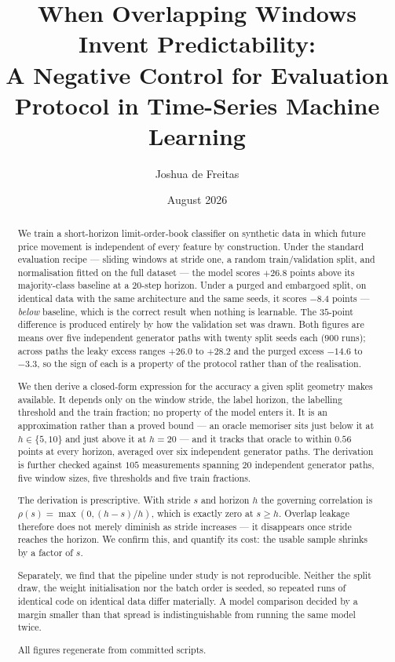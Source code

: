\documentclass[11pt,a4paper]{article}
\title{When Overlapping Windows Invent Predictability:\\
A Negative Control for Evaluation Protocol in Time-Series Machine Learning}
\author{Joshua de Freitas}
\date{August 2026}
\begin{document}
\maketitle

\begin{abstract}
\noindent
We train a short-horizon limit-order-book classifier on synthetic data in which
future price movement is independent of every feature by construction. Under the
standard evaluation recipe --- sliding windows at stride one, a random
train/validation split, and normalisation fitted on the full dataset --- the
model scores $+26.8$ points above its majority-class baseline at a
$20$-step horizon. Under a purged and embargoed split, on identical data with the
same architecture and the same seeds, it scores $-8.4$ points ---
\emph{below} baseline, which is the correct result when nothing is learnable.
The $35$-point difference is produced entirely by how the validation set was
drawn. Both figures are means over five independent generator paths with twenty
split seeds each ($900$ runs); across paths the leaky excess ranges
$+26.0$ to $+28.2$ and the purged excess $-14.6$ to $-3.3$, so the sign of each is a property of the protocol rather than
of the realisation.

We then derive a closed-form expression for the accuracy a given split geometry
makes available. It depends only on the window stride, the label horizon, the
labelling threshold and the train fraction; no property of the model enters it.
It is an approximation rather than a proved bound --- an oracle memoriser sits
just below it at $h \in \{5,10\}$ and just above it at $h=20$ --- and it tracks
that oracle to within $0.56$ points at every horizon, averaged over six
independent generator paths. The derivation is further checked
against $105$ measurements spanning $20$ independent generator paths,
five window sizes, five thresholds and five train fractions.

The derivation is prescriptive. With stride $s$ and horizon $h$ the governing
correlation is $\rho(s)=\max\!\left(0,(h-s)/h\right)$, which is exactly zero at
$s \geq h$. Overlap leakage therefore does not merely diminish as stride
increases --- it disappears once stride reaches the horizon. We confirm this,
and quantify its cost: the usable sample shrinks by a factor of $s$.

Separately, we find that the pipeline under study is not reproducible. Neither the
split draw, the weight initialisation nor the batch order is seeded, so repeated
runs of identical code on identical data differ materially. A model comparison
decided by a margin smaller than that spread is indistinguishable from running
the same model twice.

All figures regenerate from committed scripts.
\end{abstract}
\end{document}
